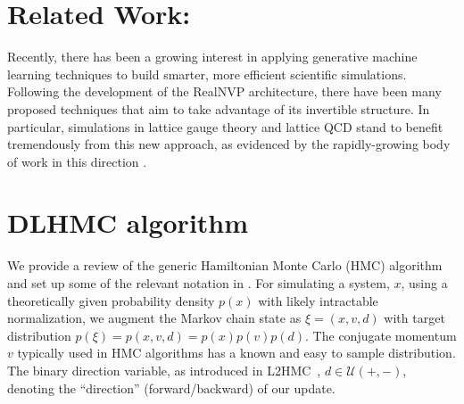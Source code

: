 \documentclass{article} %
\begin{document}
\section{\label{sec:related_work}Related Work:}
Recently, there has been a growing interest in applying generative machine learning techniques to build smarter, more efficient scientific simulations.
%
Following the development of the RealNVP \citep{dinhRealNVP} architecture, there have been many proposed techniques that aim to take advantage of its invertible structure.
%
In particular, simulations in lattice gauge theory and lattice QCD stand to benefit tremendously from this new approach, as evidenced by the rapidly-growing body of work in this direction 
\citep{%
   albergo2019flow,albergo2021introduction,favoni2020lattice,medvidovic2020generative,neklyudov2020orbital,
   neklyudov2020involutive, li2020neural,boyda2020sampling,kanwar2020equivariant,toth2019hamiltonian,
   hoffman2019neutra,wehenkel2020you,pasarica2010adaptively, dinhRealNVP,tanaka2017towards,
   rezende2020normalizing%
}.

\section{\label{sec:method}DLHMC algorithm}
%
We provide a review of the generic Hamiltonian Monte Carlo (HMC) algorithm and set up some of the relevant notation in
.
%
For simulating a system, $x$, using a theoretically given probability density $p(x)$ with likely intractable normalization,
we augment the Markov chain state as
\(\xi = (x, v, d)\) with target distribution \(p(\xi) = p(x, v, d) = p(x) p(v) p(d)\).
The conjugate momentum $v$ typically used in HMC algorithms has a known and easy to sample distribution.
%
The binary direction variable, as introduced in L2HMC~\citep{levy2017},
\(d\in\mathcal{U}(+,-)\), %
denoting the ``direction'' (forward/backward) of our update.
%
%
\end{document}
